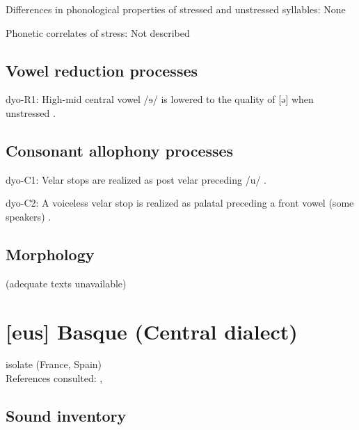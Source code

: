 {\begin{appendixdesc}
\item[Differences in phonological properties of stressed and unstressed syllables:] None

\item[Phonetic correlates of stress:] Not described
\end{appendixdesc}
\subsection*{Vowel reduction processes}
\begin{appendixdesc}

\item[dyo-R1:] High-mid central vowel /ɘ/ is lowered to the quality of  [ə] when unstressed \citep[6]{Sapir1965}.
\end{appendixdesc}
\subsection*{Consonant allophony processes}
\begin{appendixdesc}

\item[dyo-C1:] Velar stops are realized as post velar preceding /u/ \citep[5]{Sapir1965}.

\item[dyo-C2:] A voiceless velar stop is realized as palatal preceding a front vowel (some speakers) \citep{Sapir1965}.
\end{appendixdesc}
\subsection*{Morphology}

(adequate texts unavailable)
\section*{[eus] Basque (Central dialect)}   %
isolate (France, Spain)\medskip\\
References consulted: \citet{Hualde2003}, \citet{SaltarelliEtAl1988}

\subsection*{Sound inventory}
\begin{appendixdesc}


\end{appendixdesc}}
